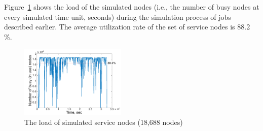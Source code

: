 Figure~\ref{fig-simulator-load-1y} shows the load of the simulated nodes (i.e., the number of busy nodes at every simulated time unit, seconds) during the simulation process of jobs described earlier. The average utilization rate of the set of service nodes is 88.2 \%.

\begin{figure}
    \centering
    \includegraphics[width=0.45\textwidth]{pics/simulator-load-1y.png}
    \caption{The load of simulated service nodes (18,688 nodes)}
    \label{fig-simulator-load-1y} 
\end{figure}
